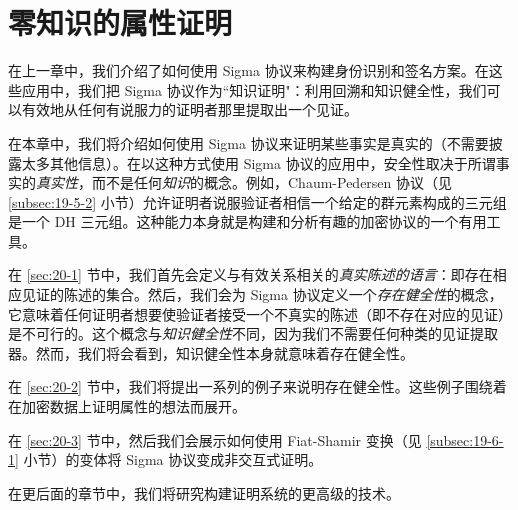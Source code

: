 \chapter{零知识的属性证明}

在上一章中，我们介绍了如何使用 Sigma 协议来构建身份识别和签名方案。在这些应用中，我们把 Sigma 协议作为``知识证明"：利用回溯和知识健全性，我们可以有效地从任何有说服力的证明者那里提取出一个见证。

在本章中，我们将介绍如何使用 Sigma 协议来证明某些事实是真实的（不需要披露太多其他信息）。在以这种方式使用 Sigma 协议的应用中，安全性取决于所谓事实的\emph{真实性}，而不是任何\emph{知识}的概念。例如，Chaum-Pedersen 协议（见 \ref{subsec:19-5-2} 小节）允许证明者说服验证者相信一个给定的群元素构成的三元组是一个 DH 三元组。这种能力本身就是构建和分析有趣的加密协议的一个有用工具。

在 \ref{sec:20-1} 节中，我们首先会定义与有效关系相关的\emph{真实陈述的语言}：即存在相应见证的陈述的集合。然后，我们会为 Sigma 协议定义一个\emph{存在健全性}的概念，它意味着任何证明者想要使验证者接受一个不真实的陈述（即不存在对应的见证）是不可行的。这个概念与\emph{知识健全性}不同，因为我们不需要任何种类的见证提取器。然而，我们将会看到，知识健全性本身就意味着存在健全性。

在 \ref{sec:20-2} 节中，我们将提出一系列的例子来说明存在健全性。这些例子围绕着在加密数据上证明属性的想法而展开。

在 \ref{sec:20-3} 节中，然后我们会展示如何使用 Fiat-Shamir 变换（见 \ref{subsec:19-6-1} 小节）的变体将 Sigma 协议变成非交互式证明。

在更后面的章节中，我们将研究构建证明系统的更高级的技术。









